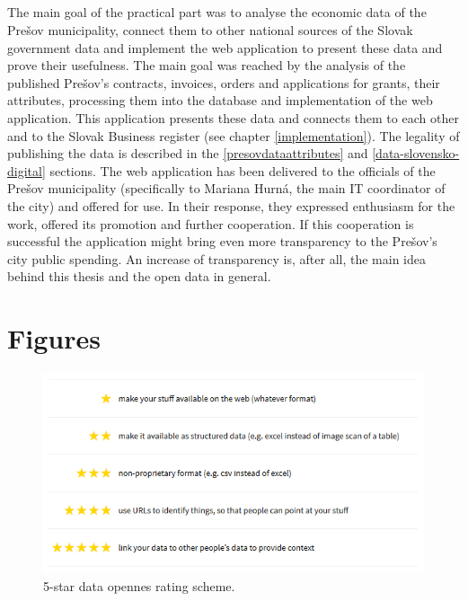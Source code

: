 \documentclass[thesis=B,english]{sprlajur-slovakopendata}[2018/05/12]
\begin{document}
{\begin{conclusion}
		\paragraph*{} The main goal of the practical part was to analyse the economic data of the Prešov municipality, connect them to other national sources of the Slovak government data and implement the web application to present these data and prove their usefulness. The main goal was reached by the analysis of the published Prešov's contracts, invoices, orders and applications for grants, their attributes, processing them into the database and implementation of the web application. This application presents these data and connects them to each other and to the Slovak Business register (see chapter \ref{implementation}). The legality of publishing the data is described in the \ref{presovdataattributes} and \ref{data-slovensko-digital} sections. The web application has been delivered to the officials of the Prešov municipality (specifically to Mariana Hurná, the main IT coordinator of the city) and offered for use. In their response, they expressed enthusiasm for the work, offered its promotion and further cooperation. If this cooperation is successful the application might bring even more transparency to the Prešov's city public spending. An increase of transparency is, after all, the main idea behind this thesis and the open data in general.
			
	\end{conclusion}
	
	\chapter*{Figures}
	\begin{figure}[H]
		\includegraphics[width=\linewidth]{pictures/5starRating.png}
		\caption{5-star data opennes rating scheme. \cite{5stardata}}
		\label{fig:5-star}
	\end{figure}
	
}
\end{document}
